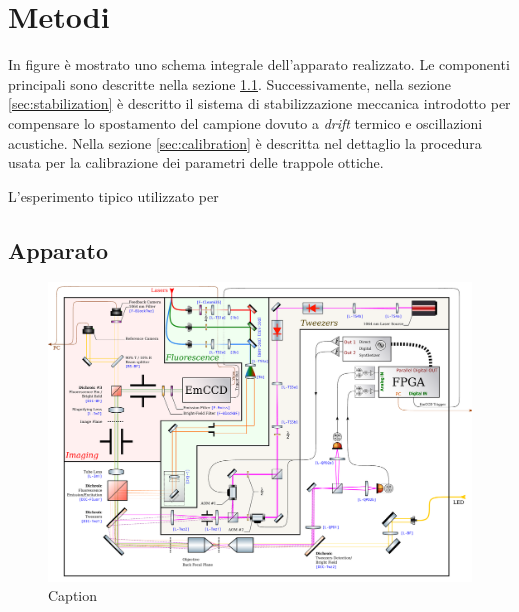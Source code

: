 \chapter{Metodi}

In figure \label{fig:setup} è mostrato uno schema integrale dell'apparato realizzato.
Le componenti principali sono descritte nella sezione \ref{sec:setup}.
Successivamente, nella sezione \ref{sec:stabilization} è descritto il sistema di stabilizzazione meccanica introdotto per compensare lo spostamento
del campione dovuto a \textit{drift} termico e oscillazioni acustiche.
Nella sezione \ref{sec:calibration} è descritta nel dettaglio la procedura
usata per la calibrazione dei parametri delle trappole ottiche.

L'esperimento tipico utilizzato per

\section{Apparato}
\label{sec:setup}

\begin{figure}
    \includegraphics[width=1.0\linewidth]{images/Setup.pdf}
    \caption{Caption}
    \label{fig:setup}
\end{figure}

